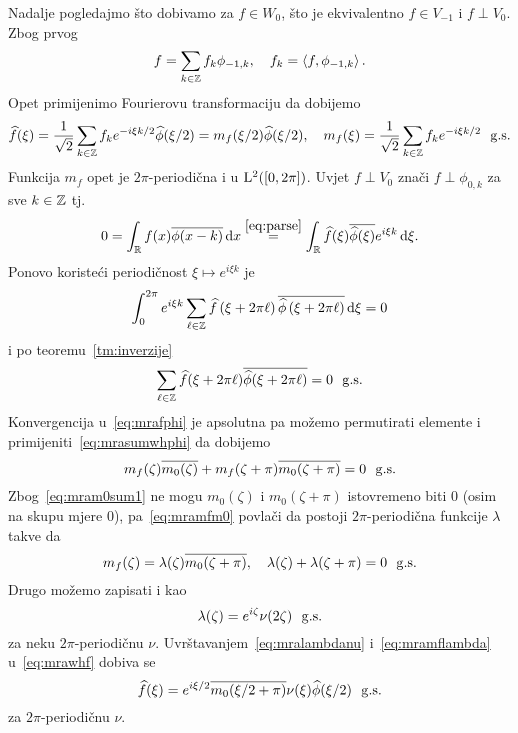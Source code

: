 \documentclass[main.tex]{subfiles}
\begin{document}
Nadalje pogledajmo što dobivamo za \( f \in W_0 \), što je ekvivalentno
\( f \in V_{-1} \) i \( f \perp V_0 \).
Zbog prvog
\begin{equation}
	f = \sum_{k \in \mathbb{Z}} f_k \phi_{-1,k}, \quad
	f_k = \left\langle {f}, {\phi_{-1, k}} \right\rangle.
\end{equation}
Opet primijenimo Fourierovu transformaciju da dobijemo
\begin{equation}\label{eq:mrawhf}
	\widehat{f}(\xi) = \frac 1{\sqrt 2} \sum_{k \in \mathbb{Z}}
	f_k e^{-i\xi k/2} \widehat{\phi}(\xi/2) = m_f(\xi/2)\widehat{\phi}(\xi/2),
	\quad m_f(\xi) = \frac 1{\sqrt 2} \sum_{k \in \mathbb{Z}} f_k e^{-i\xi k/2} \ \ \mathrm{g.s.}
\end{equation}
Funkcija \( m_f \) opet je \( 2\pi \)-periodična i u \( \mathrm{L}^2([0,2\pi]) \).
Uvjet \( f \perp V_0 \) znači \( f \perp \phi_{0,k} \) za sve \( k \in \mathbb{Z} \) tj.
\begin{equation}
	0 = \int_{\mathbb{R}} f(x) \overline{\phi(x-k)} \,\mathrm d x \stackrel{\scriptstyle {\eqref{eq:parse}}}{=}
	\int_{\mathbb{R}} \widehat{f}(\xi) \overline{\widehat{\phi}(\xi)} e^{i\xi k} \,\mathrm d \xi.
\end{equation}
Ponovo koristeći periodičnost \( \xi \mapsto e^{i\xi k} \) je
\begin{equation}
	\int_0^{2\pi} e^{i\xi k} \sum_{\ell \in \mathbb{Z}}
	\widehat{f}\left( \xi + 2\pi\ell \right) \overline{\widehat{\phi} \left( \xi + 2\pi\ell \right)}
	\,\mathrm d \xi = 0
\end{equation}
i po teoremu~\ref{tm:inverzije}
\begin{equation}\label{eq:mrafphi}
	\sum_{\ell \in \mathbb{Z}} \widehat{f}(\xi + 2\pi\ell) \overline{\widehat{\phi}(\xi + 2\pi\ell)} = 0 \ \ \mathrm{g.s.}
\end{equation}
Konvergencija u~\eqref{eq:mrafphi} je apsolutna
pa možemo permutirati elemente i primijeniti~\eqref{eq:mrasumwhphi}
da dobijemo
\begin{equation}\label{eq:mramfm0}
	m_f(\zeta)\overline{m_0(\zeta)} + m_f(\zeta+\pi) \overline{m_0(\zeta+\pi)} = 0 \ \ \mathrm{g.s.}
\end{equation}
Zbog~\eqref{eq:mram0sum1} ne mogu
\( m_0(\zeta) \) i \( m_0(\zeta + \pi) \) istovremeno biti \( 0 \)
(osim na skupu mjere \( 0 \)), pa~\eqref{eq:mramfm0}
povlači da postoji \( 2\pi \)-periodična funkcije \( \lambda \) takve da
\begin{equation}\label{eq:mramflambda}
	m_f(\zeta) = \lambda(\zeta) \overline{m_0(\zeta + \pi)}, \quad
	\lambda(\zeta) + \lambda(\zeta + \pi)=0 \ \ \mathrm{g.s.}
\end{equation}
Drugo možemo zapisati i kao
\begin{equation}\label{eq:mralambdanu}
	\lambda(\zeta) = e^{i\zeta} \nu(2\zeta) \ \ \mathrm{g.s.}
\end{equation}
za neku \( 2\pi \)-periodičnu \( \nu \).
Uvrštavanjem~\eqref{eq:mralambdanu} i~\eqref{eq:mramflambda}
u~\eqref{eq:mrawhf} dobiva se
\begin{equation}\label{eq:mradefwhf}
	\widehat{f}(\xi) = e^{i\xi/2} \overline{m_0(\xi/2 + \pi)} \nu(\xi) \widehat{\phi}(\xi/2) \ \ \mathrm{g.s.}
\end{equation}
za \( 2\pi \)-periodičnu \( \nu \).
\end{document}
